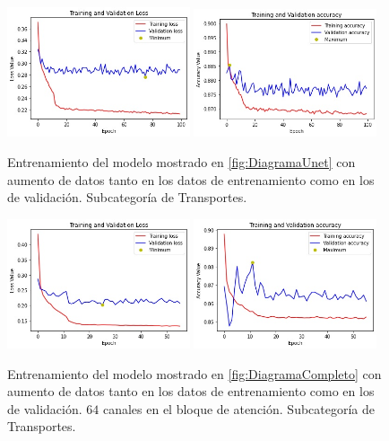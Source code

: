 \begin{figure}[htpb]
  \centering
  \includegraphics[width=0.48\textwidth]{../../modelos-entrenados/unet/ejecucion2/lossUnet2}
  \includegraphics[width=0.48\textwidth]{../../modelos-entrenados/unet/ejecucion2/accUnet2}
  \caption{Entrenamiento del modelo mostrado en \autoref{fig:DiagramaUnet} con aumento de datos tanto en los datos de entrenamiento como en los de validación. Subcategoría de Transportes.}
  \label{fig:ejec2}
\end{figure}

\begin{figure}[htpb]
  \centering
  \includegraphics[width=0.48\textwidth]{../../modelos-entrenados/unet-nonlocal/ejecucion3/loss}
  \includegraphics[width=0.48\textwidth]{../../modelos-entrenados/unet-nonlocal/ejecucion3/acc}
  \caption{Entrenamiento del modelo mostrado en \autoref{fig:DiagramaCompleto} con aumento de datos tanto en los datos de entrenamiento como en los de validación. $64$ canales en el bloque de atención. Subcategoría de Transportes.}
  \label{fig:ejec3}
\end{figure}

